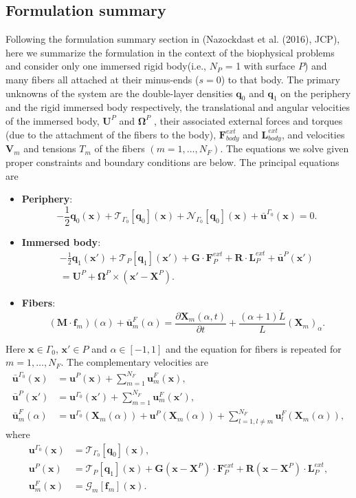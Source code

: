 \documentclass{article}
\newcommand{\OOmega}{\boldsymbol{\Omega}}
\newcommand{\UU}{\mathbf{U}}
\newcommand{\XX}{\mathbf{X}}
\newcommand{\RR}{\mathbf{R}}
\newcommand{\xx}{\mathbf{x}}
\newcommand{\qq}{\mathbf{q}}
\newcommand{\ubarF}{\bar{\mathbf{u}}^F}
\newcommand{\uF}{{\mathbf{u}}^F}
\newcommand{\ubarP}{\bar{\mathbf{u}}^P}
\newcommand{\uP}{{\mathbf{u}}^P}
\newcommand{\ubarG}{\bar{\mathbf{u}}^{\Gamma_0}}
\newcommand{\uG}{{\mathbf{u}}^{\Gamma_0}}
\newcommand{\ff}{\mathbf{f}}
\newcommand{\FF}{\mathbf{F}}
\newcommand{\GG}{\mathbf{G}}
\newcommand{\MM}{\mathbf{M}}
\newcommand{\calG}{\mathcal{G}}
\newcommand{\calN}{\mathcal{N}}
\newcommand{\calT}{\mathcal{T}}
\newcommand{\VV}{\mathbf{V}}
\newcommand{\LL}{\mathbf{L}}
\begin{document}
\subsection{Formulation summary}
Following the formulation summary section in (Nazockdast et al. (2016), JCP), here we summarize the formulation in the context of the biophysical problems and consider only one immersed rigid body(i.e., $N_P$ = 1 with surface $P$) and many fibers all attached at their minus-ends ($s = 0$) to that body. The primary unknowns of the system are the double-layer densities $\qq_0$ and $\qq_1$ on the periphery and the rigid immersed body respectively, the translational and angular velocities of the immersed body, $\UU^P$ and $\OOmega^P$ , their associated external forces and torques (due to the attachment of the fibers to the body), $\FF^{ext}_{body}$ and $\LL^{ext}_{body}$, and velocities $\VV_m$ and tensions $T_m$ of the fibers $(m = 1, \dots, N_F)$. The equations we solve given proper constraints and boundary conditions are below.
The principal equations are
\begin{itemize}
    \item \textbf{Periphery}:
    \begin{equation}
     -\frac{1}{2}\qq_0(\xx) + \calT_{\Gamma_0}[\qq_0](\xx) + \calN_{\Gamma_0}[\qq_0](\xx) + \ubarG(\xx) = 0.
    \end{equation}

    \item \textbf{Immersed body}:
    \begin{multline}
     -\frac{1}{2}\qq_1(\xx') + \calT_P [\qq_1](\xx') + \GG\cdot\FF^{ext}_P + \RR\cdot\LL^{ext}_P + \ubarP(\xx') \\
     = \UU^P + \OOmega^P \times (\xx' - \XX^P).
    \end{multline}

    \item \textbf{Fibers}:
    \begin{equation}
      (\MM\cdot\ff_m)(\alpha) + \ubarF_m (\alpha) = \frac{\partial \XX_m(\alpha,t)}{\partial t} + \frac{(\alpha +1)\dot{L}}{L} (\XX_m)_{\alpha}.
    \end{equation}
\end{itemize}

Here $\xx \in \Gamma_0$, $\xx' \in P$ and $\alpha \in [-1, 1]$ and the equation for fibers is repeated for $m = 1, \dots, N_F$. The complementary velocities are
\begin{align}
    \ubarG(\xx) & = \uP(\xx) + \sum_{m=1}^{N_F}\uF_m(\xx),\\
    \ubarP(\xx') & = \uG(\xx') + \sum_{m=1}^{N_F}\uF_m(\xx'),\\
    \ubarF_m(\alpha) &= \uG(\XX_m(\alpha)) + \uP(\XX_m(\alpha)) + \sum_{l = 1, l\neq m}^{N_F} \uF_l(\XX_m(\alpha)),
\end{align}
where
\begin{align}
    \uG(\xx) & = \calT_{\Gamma_0}[\qq_0](\xx),\\
    \uP(\xx) & = \calT_P[\qq_1](\xx) + \GG(\xx-\XX^P)\cdot\FF^{ext}_P + \RR(\xx-\XX^P)\cdot\LL^{ext}_P,\\
    \uF_m(\xx) &= \calG_m[\ff_m](\xx).
\end{align}
\end{document}
